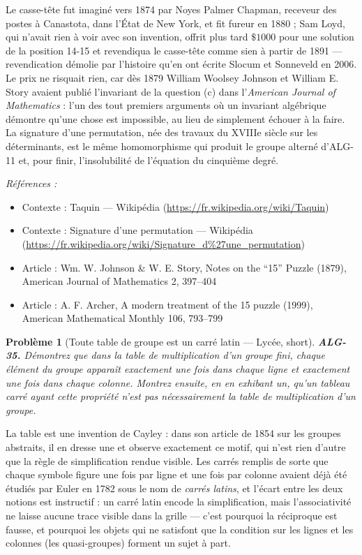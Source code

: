 \documentclass[11pt]{article}
\newtheorem{problem}{Problème}
\newenvironment{refs}{\par\small\noindent\emph{Références :}\begin{itemize}\setlength\itemsep{0pt}}{\end{itemize}\normalsize}
\begin{document}
\noindent Le casse-tête fut imaginé vers 1874 par Noyes Palmer Chapman, receveur des postes à
Canastota, dans l'État de New York, et fit fureur en 1880 ; Sam Loyd, qui n'avait rien à voir avec son
invention, offrit plus tard $\$1000$ pour une solution de la position 14-15 et revendiqua le casse-tête
comme sien à partir de 1891 --- revendication démolie par l'histoire qu'en ont écrite Slocum et Sonneveld en
2006. Le prix ne risquait rien, car dès 1879 William Woolsey Johnson et William E. Story avaient publié
l'invariant de la question (c) dans l'\textit{American Journal of Mathematics} : l'un des tout premiers
arguments où un invariant algébrique démontre qu'une chose est impossible, au lieu de simplement échouer à
la faire. La signature d'une permutation, née des travaux du XVIIIe siècle sur les déterminants,
est le même homomorphisme qui produit le groupe alterné d'ALG-11 et, pour finir, l'insolubilité de
l'équation du cinquième degré.

\begin{refs}
\item Contexte : Taquin --- Wikipédia (\url{https://fr.wikipedia.org/wiki/Taquin})
\item Contexte : Signature d'une permutation --- Wikipédia (\url{https://fr.wikipedia.org/wiki/Signature_d%27une_permutation})
\item Article : Wm. W. Johnson \& W. E. Story, \og{} Notes on the ``15'' Puzzle \fg{} (1879), American Journal of Mathematics 2, 397--404
\item Article : A. F. Archer, \og{} A modern treatment of the 15 puzzle \fg{} (1999), American Mathematical Monthly 106, 793--799
\end{refs}

\bigskip

\begin{problem}[{Toute table de groupe est un carré latin --- Lycée, short}]
\textbf{ALG-35.} Démontrez que dans la table de multiplication d'un groupe fini,
chaque élément du groupe apparaît exactement une fois dans chaque ligne et exactement une fois dans chaque
colonne. Montrez ensuite, en en exhibant un, qu'un tableau carré ayant cette propriété n'est pas
nécessairement la table de multiplication d'un groupe.
\end{problem}

\noindent La table est une invention de Cayley : dans son article de 1854 sur les groupes abstraits,
il en dresse une et observe exactement ce motif, qui n'est rien d'autre que la règle de simplification rendue
visible. Les carrés remplis de sorte que chaque symbole figure une fois par ligne et une fois par colonne
avaient déjà été étudiés par Euler en 1782 sous le nom de \textit{carrés latins}, et l'écart entre les deux
notions est instructif : un carré latin encode la simplification, mais l'associativité ne laisse aucune trace
visible dans la grille --- c'est pourquoi la réciproque est fausse, et pourquoi les objets qui ne satisfont que
la condition sur les lignes et les colonnes (les quasi-groupes) forment un sujet à part.
\end{document}
